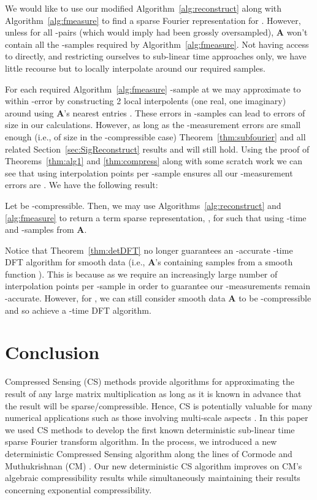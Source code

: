 \documentclass{article}
\begin{document}
We would like to use our modified Algorithm~\ref{alg:reconstruct} along with Algorithm~\ref{alg:fmeasure} to find a sparse Fourier representation for .  However, unless  for all -pairs (which would imply  had been grossly oversampled), \textbf{A} won't contain all the -samples required by Algorithm~\ref{alg:fmeasure}.  Not having access to  directly, and restricting ourselves to sub-linear time approaches only, we have little recourse but to locally interpolate  around our required samples.

For each required Algorithm~\ref{alg:fmeasure} -sample at  we may approximate  to within -error by constructing 2 local interpolents (one real, one imaginary) around  using \textbf{A}'s nearest  entries \cite{BasicInterp}.  These errors in -samples can lead to errors of size  in our  calculations.  However, as long as the -measurement errors are small enough (i.e., of size  in the -compressible case) Theorem~\ref{thm:subfourier} and all related Section~\ref{sec:SigReconstruct} results and will still hold.  Using the proof of Theorems~\ref{thm:alg1} and \ref{thm:compress} along with some scratch work we can see that using  interpolation points per -sample ensures all our -measurement errors are .  We have the following result:

\begin{Theorem}
Let  be -compressible.  Then, we may use Algorithms~\ref{alg:reconstruct} and \ref{alg:fmeasure} to return a  term sparse representation, , for  such that  using -time and -samples from \textbf{A}.
\label{thm:detDFT}
\end{Theorem}

Notice that Theorem~\ref{thm:detDFT} no longer guarantees an -accurate -time DFT algorithm for smooth data (i.e., \textbf{A}'s containing samples from a smooth function ).  This is because as  we require an increasingly large number of interpolation points per -sample in order to guarantee our -measurements remain -accurate.
However, for , we can still consider smooth data \textbf{A} to be -compressible and so achieve a -time DFT algorithm.  

\section{Conclusion}
\label{sec:conc}

Compressed Sensing (CS) methods provide algorithms for approximating the result of any large matrix multiplication as long as it is known in advance that the result will be sparse/compressible.  Hence, CS is potentially valuable for many numerical applications such as those involving multi-scale aspects \cite{SparseSpect,SparseSpectM}.  In this paper we used CS methods to develop the first known deterministic sub-linear time sparse Fourier transform algorithm.  In the process, we introduced a new deterministic Compressed Sensing algorithm along the lines of Cormode and Muthukrishnan (CM) \cite{CMDetCS1,CMDetCS2}.  
Our new deterministic CS algorithm improves on CM's algebraic compressibility results while simultaneously maintaining their results concerning exponential compressibility.
\end{document}
